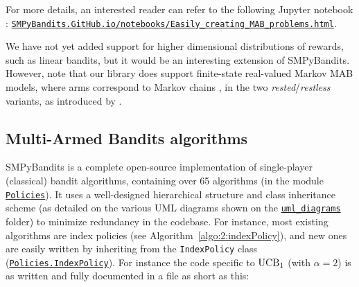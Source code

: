 For more details, an interested reader can refer to the following Jupyter notebook \cite{jupyter}:
\href{https://smpybandits.github.io/notebooks/Easily_creating_MAB_problems.html}{\texttt{SMPyBandits.GitHub.io/notebooks/Easily\_creating\_MAB\_problems.html}}.

We have not yet added support for higher dimensional distributions of rewards, such as linear bandits, but it would be an interesting extension of SMPyBandits.
%
However, note that our library does support finite-state real-valued Markov MAB models, where arms correspond to Markov chains \cite{Norris98}, in the two \emph{rested}/\emph{restless} variants, as introduced by \cite{Anantharam87b}.


\subsection{Multi-Armed Bandits algorithms}

SMPyBandits is a complete open-source implementation of single-player (classical) bandit algorithms,
containing over 65 algorithms (in the module \texttt{\href{https://SMPyBandits.GitHub.io/docs/Policies.html}{Policies}}).
It uses a well-designed hierarchical structure and class inheritance scheme (as detailed on the various UML diagrams shown on the \texttt{\href{https://SMPyBandits.GitHub.io/uml_diagrams/README.html}{uml\_diagrams}} folder) to minimize redundancy in the codebase.
For instance, most existing algorithms are index policies (see Algorithm~\ref{algo:2:indexPolicy}), and new ones are easily written by inheriting from the \texttt{IndexPolicy} class (\texttt{\href{https://SMPyBandits.GitHub.io/docs/Policies.IndexPolicy.html}{Policies.IndexPolicy}}).
For instance the code specific to $\mathrm{UCB}_1$ (with $\alpha=2$) is as written and fully documented in a file as short as this:

\begin{small}
    \inputminted[linenos=true,numbersep=5pt,frame=lines,framesep=2mm]{python3}{2-Chapters/3-Chapter/src/example_of_a_IndexPolicy_UCB.py}
\end{small}



